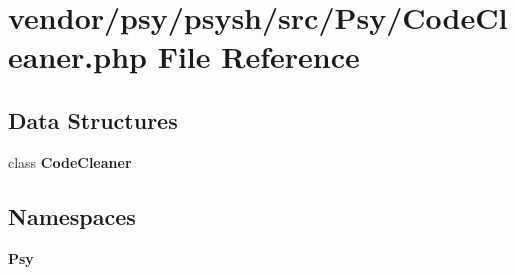 \section{vendor/psy/psysh/src/\+Psy/\+Code\+Cleaner.php File Reference}
\label{_code_cleaner_8php}
\subsection*{Data Structures}
\begin{DoxyCompactItemize}
\item 
class {\bf Code\+Cleaner}
\end{DoxyCompactItemize}
\subsection*{Namespaces}
\begin{DoxyCompactItemize}
\item 
 {\bf Psy}
\end{DoxyCompactItemize}

